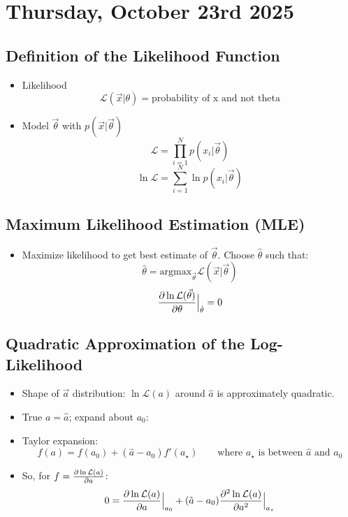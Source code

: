 \section{Thursday, October 23rd 2025}

\subsection{Definition of the Likelihood Function}

\begin{itemize}
      \item Likelihood
            \[ \mathcal{L}(\vec{x}|\theta) = \text{probability of x and not theta} \]
      \item Model $\vec{\theta}$ with $p(\vec{x}|\vec{\theta})$
            \[ \mathcal{L} = \prod_{i=1}^{N} p(x_i|\vec{\theta}) \]
            \[ \ln \mathcal{L} = \sum_{i=1}^{N} \ln p(x_i|\vec{\theta}) \]
\end{itemize}

\subsection{Maximum Likelihood Estimation (MLE)}

\begin{itemize}
      \item Maximize likelihood to get best estimate of $\vec{\theta}$. Choose $\hat{\theta}$ such that:
            \[ \hat{\theta} = \text{argmax}_{\vec{\theta}} \mathcal{L}(\vec{x}|\vec{\theta}) \]
            \[ \pdv{\ln \mathcal{L(\vec{\theta})}}{\theta} \Big|_{\hat{\theta}} = 0 \]
\end{itemize}

\subsection{Quadratic Approximation of the Log-Likelihood}

\begin{itemize}
      \item Shape of $\vec{a}$ distribution: $\ln \mathcal{L}(a)$ around $\hat{a}$ is approximately quadratic.
      \item True $a = \hat{a}$; expand about $a_0$:
      \item Taylor expansion:
            \[ f(a) = f(a_0) + (\hat{a} - a_0) f'(a_\star) \qquad \text{where } a_{\star} \text{ is between } \hat{a} \text{ and } a_0 \]
      \item So, for $f = \pdv{\ln \mathcal{L}(a)}{a}$:
            \[ 0 = \pdv{\ln \mathcal{L}(a)}{a} \Big|_{a_0} + (\hat{a} - a_0) \pdv[2]{\ln \mathcal{L}(a)}{a} \Big|_{a_{\star}} \]
\end{itemize}

